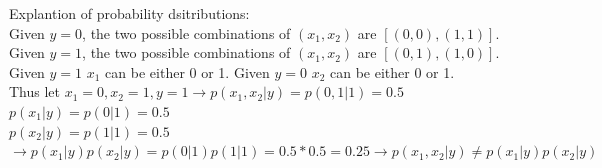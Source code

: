 \documentclass[12pt]{article}
\begin{document}
\begin{enumerate}[leftmargin=\parindent,align=left,labelwidth=\parindent,noitemsep]
\begin{enumerate}[noitemsep,topsep=2pt]
    Explantion of probability dsitributions: \\
    Given $y = 0$, the two possible combinations of $(x_1, x_2)$ are $[(0,0), (1,1)]$. \\
    Given $y = 1$, the two possible combinations of $(x_1, x_2)$ are $[(0,1), (1,0)]$.\\
    Given $y=1$ $x_1$ can be either 0 or 1. Given $y=0$ $x_2$ can be either 0 or 1. \\
    Thus let $x_1 = 0, x_2 = 1, y=1 \rightarrow p(x_1,x_2 \vert y) = p(0,1 \vert 1) = 0.5$ \\
    $p(x_1 \vert y) = p(0 \vert 1) = 0.5$ \\
    $p(x_2 \vert y) = p(1 \vert 1) = 0.5$ \\
    $\rightarrow p(x_1 \vert y)p(x_2 \vert y) = p(0 \vert 1)p(1 \vert 1) = 0.5 * 0.5 = 0.25 \rightarrow p(x_1,x_2 \vert y) \neq p(x_1 \vert y)p(x_2 \vert y)$
\end{enumerate}
\end{enumerate}
\end{document}
